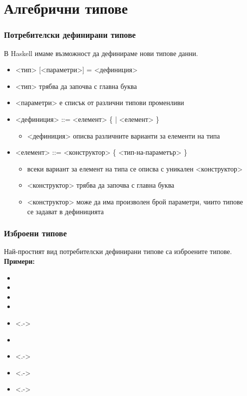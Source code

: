 \documentclass[alsotrans]{beamerswitch}
\begin{document}
\section{Алгебрични типове}

\begin{frame}
  \frametitle{Потребителски дефинирани типове}
  В Haskell имаме възможност да дефинираме нови типове данни.\\[2ex]
  \begin{itemize}[<+->]
  \item {} <тип> [<параметри>] \tta= <дефиниция>
  \item{} <тип> трябва да започва с главна буква
  \item{} <параметри> е списък от различни типови променливи
  \item{} <дефиниция> ::= <елемент> \{ \tta| <елемент> \}
    \begin{itemize}
    \item{} <дефиниция> описва различните варианти за елементи на типа
    \end{itemize}
  \item{} <елемент> ::= <конструктор> \{ <тип-на-параметър> \}
    \begin{itemize}
    \item всеки вариант за елемент на типа се описва с уникален <конструктор>
    \item{} <конструктор> трябва да започва с главна буква
    \item{} <конструктор> може да има произволен брой параметри, чиито типове се задават в дефиницията
    \end{itemize}
  \end{itemize}
\end{frame}

\begin{frame}
  \frametitle{Изброени типове}
  Най-простият вид потребителски дефинирани типове са \alert{изброените типове}.\\[2ex]
  \pause
  \textbf{Примери:}
  \begin{itemize}[<+->]
  \item {}
  \item {}
  \item {}
  \item {}
  \item<.-> 
  \item {}
  \item<.-> 
  \item<.-> 
  \item<.-> 
  \end{itemize}
\end{frame}
\end{document}
